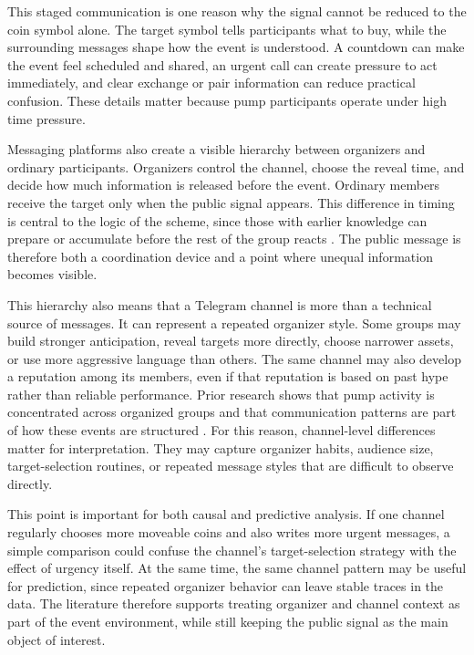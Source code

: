 This staged communication is one reason why the signal cannot be reduced to the coin symbol alone. The target symbol tells participants what to buy, while the surrounding messages shape how the event is understood. A countdown can make the event feel scheduled and shared, an urgent call can create pressure to act immediately, and clear exchange or pair information can reduce practical confusion. These details matter because pump participants operate under high time pressure.

Messaging platforms also create a visible hierarchy between organizers and ordinary participants. Organizers control the channel, choose the reveal time, and decide how much information is released before the event. Ordinary members receive the target only when the public signal appears. This difference in timing is central to the logic of the scheme, since those with earlier knowledge can prepare or accumulate before the rest of the group reacts \cite{xu2019anatomy, li2021cryptocurrency}. The public message is therefore both a coordination device and a point where unequal information becomes visible.

This hierarchy also means that a Telegram channel is more than a technical source of messages. It can represent a repeated organizer style. Some groups may build stronger anticipation, reveal targets more directly, choose narrower assets, or use more aggressive language than others. The same channel may also develop a reputation among its members, even if that reputation is based on past hype rather than reliable performance. Prior research shows that pump activity is concentrated across organized groups and that communication patterns are part of how these events are structured \cite{hamrick2021examination, xu2019anatomy, lamorgia2023doge}. For this reason, channel-level differences matter for interpretation. They may capture organizer habits, audience size, target-selection routines, or repeated message styles that are difficult to observe directly.

This point is important for both causal and predictive analysis. If one channel regularly chooses more moveable coins and also writes more urgent messages, a simple comparison could confuse the channel's target-selection strategy with the effect of urgency itself. At the same time, the same channel pattern may be useful for prediction, since repeated organizer behavior can leave stable traces in the data. The literature therefore supports treating organizer and channel context as part of the event environment, while still keeping the public signal as the main object of interest.

